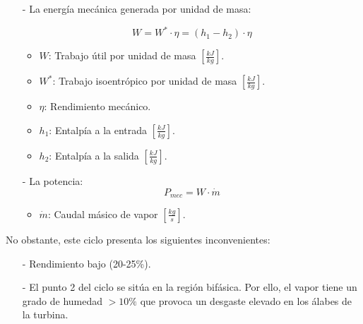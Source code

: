 \begin{itemize}
	
	

\item [-]La energía mecánica generada por unidad de masa:

\[W=W^*\cdot \eta =(h_1-h_2)\cdot \eta\]
\begin{itemize}
	\item $W$: Trabajo útil por unidad de masa $\left[\frac{kJ}{kg}\right]$.
	\item $W^*$: Trabajo isoentrópico por unidad de masa $\left[\frac{kJ}{kg}\right]$.
	\item $\eta$: Rendimiento mecánico.
	\item $h_1$: Entalpía a la entrada $\left[\frac{kJ}{kg}\right]$.
	\item $h_2$: Entalpía a la salida $\left[\frac{kJ}{kg}\right]$.
\end{itemize}


\item [-]La potencia:
\[P_{mec}=W\cdot \dot{m}\]
\begin{itemize}
	\item $\dot{m}$: Caudal másico de vapor $\left[\frac{kg}{s}\right]$.
\end{itemize}

\end{itemize}

No obstante, este ciclo presenta los siguientes inconvenientes:
\begin{itemize}
  	\item [-] Rendimiento bajo (20-25\%).
	\item [-] El punto 2 del ciclo se sitúa en la región bifásica. Por ello, el vapor tiene un grado de humedad $>10\%$ que provoca un desgaste elevado en los álabes de la turbina.
\end{itemize}



